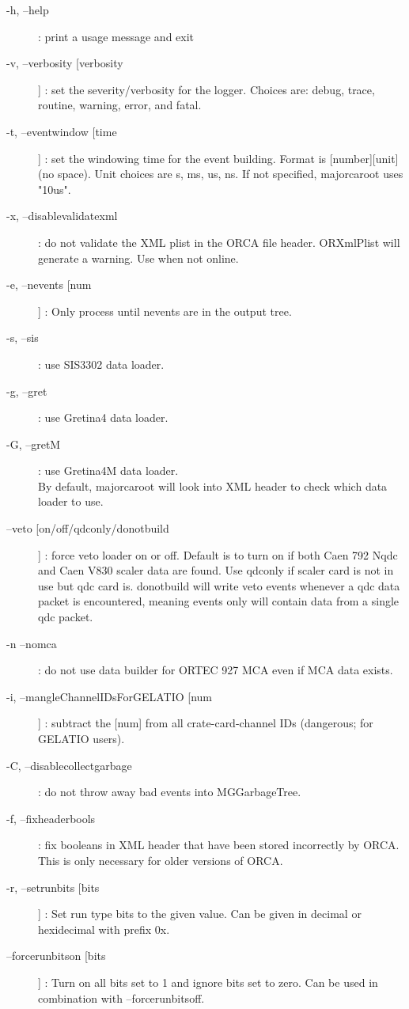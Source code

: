 \documentclass[/main.tex]{subfiles}
\begin{document}
\begin{description}
  \item[-h, --help] : print a usage message and exit
  \item[-v, --verbosity [verbosity]] : set the severity/verbosity for the logger. Choices are: debug, trace, routine, warning, error, and fatal.
  \item[-t, --eventwindow [time]] : set the windowing time for the event building. Format is [number][unit] (no space). Unit choices are s, ms, us, ns. If not specified, majorcaroot uses "10us". 
  \item[-x, --disablevalidatexml] : do not validate the XML plist in the ORCA file header. ORXmlPlist will generate a warning. Use when not online.
  \item[-e, --nevents [num]] : Only process until nevents are in the output tree. 
  \item[-s, --sis] : use SIS3302 data loader. 
  \item[-g, --gret] : use Gretina4 data loader. 
  \item[-G, --gretM] : use Gretina4M data loader.
    \\By default, majorcaroot will look into XML header to check which data loader to use.
  \item[--veto [on/off/qdconly/donotbuild]] : force veto loader on or off. Default is to turn on if both Caen 792 Nqdc and Caen V830 scaler data are found. Use qdconly if scaler card is not in use but qdc card is. donotbuild will write veto events whenever a qdc data packet is encountered, meaning events only will contain data from a single qdc packet.
  \item[-n --nomca] : do not use data builder for ORTEC 927 MCA even if MCA data exists. 
  \item[-i, --mangleChannelIDsForGELATIO [num]] : subtract the [num] from all crate-card-channel IDs (dangerous; for GELATIO users). 
  \item[-C, --disablecollectgarbage] : do not throw away bad events into MGGarbageTree.
  \item[-f, --fixheaderbools] : fix booleans in XML header that have been stored incorrectly by ORCA. This is only necessary for older versions of ORCA.
  \item[-r, --setrunbits [bits]] : Set run type bits to the given value. Can be given in decimal or hexidecimal with prefix 0x.
  \item[--forcerunbitson [bits]] : Turn on all bits set to 1 and ignore bits set to zero. Can be used in combination with --forcerunbitsoff.

\end{description}
\end{document}
